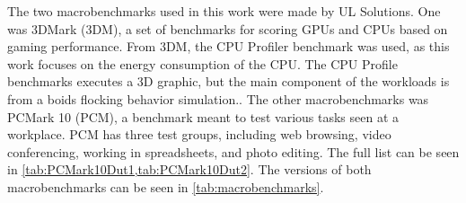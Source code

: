 The two macrobenchmarks used in this work were made by UL Solutions. One was 3DMark (3DM), a set of benchmarks for scoring GPUs and CPUs based on gaming performance. From 3DM, the CPU Profiler benchmark was used, as this work focuses on the energy consumption of the CPU. The CPU Profile benchmarks executes a 3D graphic, but the main component of the workloads is from a boids flocking behavior simulation.\cite{3dmark}. The other macrobenchmarks was PCMark 10 (PCM), a benchmark meant to test various tasks seen at a workplace. PCM has three test groups, including web browsing, video conferencing, working in spreadsheets, and photo editing. The full list can be seen in \cref{tab:PCMark10Dut1,tab:PCMark10Dut2}.\cite{pcmark} The versions of both macrobenchmarks can be seen in \cref{tab:macrobenchmarks}.